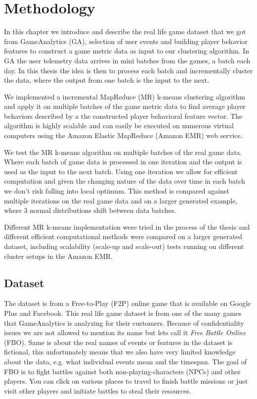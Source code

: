 
\chapter{Methodology} %
\label{Chapter4}
In this chapter we introduce and describe the real life game dataset that we got from GameAnalytics (GA), selection of user events and building player behavior features to construct a game metric data as input to our clustering algorithm. In GA the user telemetry data arrives in mini batches from the games, a batch each day. In this thesis the idea is then to process each batch and incrementally cluster the data, where the output from one batch is the input to the next.

We implemented a incremental MapReduce (MR) k-means clustering algorithm and apply it on multiple batches of the game metric data to find average player behaviors described by a the constructed player behavioral feature vector. The algorithm is highly scalable and can easily be executed on numerous virtual computers using the Amazon Elastic MapReduce (Amazon EMR) web service. 

We test the MR k-means algorithm on multiple batches of the real game data. Where each batch of game data is processed in one iteration and the output is used as the input to the next batch. Using one iteration we allow for efficient computation and given the changing nature of the data over time in each batch we don't risk falling into local optimum. This method is compared against multiple iterations on the real game data and on a larger generated example, where 3 normal distributions shift between data batches.

Different MR k-means implementation were tried in the process of the thesis and different efficient computational methods were compared on a larger generated dataset, including scalability (scale-up and scale-out) tests running on different cluster setups in the Amazon EMR.

\section{Dataset}
The dataset is from a Free-to-Play (F2P) online game that is available on Google Plus and Facebook. This real life game dataset is from one of the many games that GameAnalytics is analyzing for their customers. Because of confidentiality issues we are not allowed to mention its name but lets call it \textit{Free Battle Online} (FBO). Same is about the real names of events or features in the dataset is fictional, this unfortunately means that we also have very limited knowledge about the data, e.g. what individual events mean and the timespan. The goal of FBO is to fight battles against both non-playing-characters (NPCs) and other players. You can click on various places to travel to finish battle missions or just visit other players and initiate battles to steal their resources.

